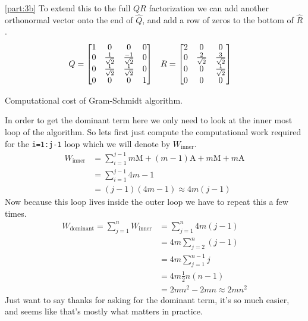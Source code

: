 \documentclass[boxes,pages]{homework}
\begin{document}
\begin{solution}
	\ref{part:3b}
	To extend this to the full $QR$ factorization we can add another orthonormal vector onto the end of $\widehat{Q}$, and add a row of zeros to the bottom of $\widehat{R}$.
	\begin{align*}
		Q & = \mqty[1 & 0 & 0 & 0\\ 0 & \frac{1}{\sqrt{2}} & \frac{-1}{\sqrt{2}} & 0 \\ 0 & \frac{1}{\sqrt{2}} & \frac{1}{\sqrt{2}} & 0 \\ 0 & 0 & 0 & 1] & R & = \mqty[2 & 0 & 0 \\ 0 & \frac{2}{\sqrt{2}} & \frac{3}{\sqrt{2}} \\ 0 & 0 & \frac{1}{\sqrt{2}} \\ 0 & 0 & 0]
	\end{align*}
\end{solution}

\begin{problem}
Computational cost of Gram-Schmidt algorithm.
\end{problem}

\begin{solution}
	In order to get the dominant term here we only need to look at the inner most loop of the algorithm. So lets first just compute the computational work required for the \texttt{i=1:j-1} loop which we will denote by $W_\text{inner}$.
	\begin{align*}
		W_\text{inner} & = \sum_{i = 1}^{j - 1}m\mathrm{M} + (m - 1)\mathrm{A} + m\mathrm{M} + m\mathrm{A} \\
		               & = \sum_{i = 1}^{j - 1}4m - 1                                                      \\
		               & = (j - 1)(4m - 1) \approx 4m(j - 1)
	\end{align*}
	Now because this loop lives inside the outer loop we have to repeat this a few times.
	\begin{align*}
		W_\text{dominant} = \sum_{j = 1}^n W_\text{inner} & = \sum_{j = 1}^n4m(j - 1)   \\
		                                                  & = 4m\sum_{j = 2}^n(j - 1)   \\
		                                                  & = 4m\sum_{j = 1}^{n- 1}j    \\
		                                                  & = 4m\frac{1}{2}n(n - 1)     \\
		                                                  & = 2mn^2 - 2mn \approx 2mn^2
	\end{align*}
	Just want to say thanks for asking for the dominant term, it's so much easier, and seems like that's mostly what matters in practice.
\end{solution}
\end{document}
